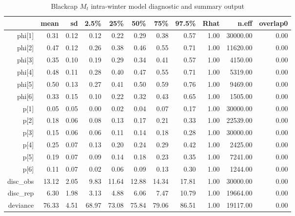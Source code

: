 \begin{table}[ht]
\centering
\begin{tabular}{rrrrrrrrrrr}
  \hline
 & mean & sd & 2.5\% & 25\% & 50\% & 75\% & 97.5\% & Rhat & n.eff & overlap0 \\ 
  \hline
phi[1] & 0.31 & 0.12 & 0.12 & 0.22 & 0.29 & 0.38 & 0.57 & 1.00 & 30000.00 & 0.00 \\ 
  phi[2] & 0.47 & 0.12 & 0.26 & 0.38 & 0.46 & 0.55 & 0.71 & 1.00 & 11620.00 & 0.00 \\ 
  phi[3] & 0.35 & 0.10 & 0.19 & 0.29 & 0.34 & 0.41 & 0.57 & 1.00 & 4150.00 & 0.00 \\ 
  phi[4] & 0.48 & 0.11 & 0.28 & 0.40 & 0.47 & 0.55 & 0.71 & 1.00 & 5319.00 & 0.00 \\ 
  phi[5] & 0.50 & 0.13 & 0.27 & 0.41 & 0.50 & 0.59 & 0.76 & 1.00 & 9469.00 & 0.00 \\ 
  phi[6] & 0.33 & 0.15 & 0.10 & 0.22 & 0.32 & 0.43 & 0.65 & 1.00 & 1505.00 & 0.00 \\ 
  p[1] & 0.05 & 0.05 & 0.00 & 0.02 & 0.04 & 0.07 & 0.17 & 1.00 & 30000.00 & 0.00 \\ 
  p[2] & 0.18 & 0.06 & 0.08 & 0.13 & 0.17 & 0.21 & 0.33 & 1.00 & 22539.00 & 0.00 \\ 
  p[3] & 0.15 & 0.06 & 0.06 & 0.11 & 0.14 & 0.18 & 0.28 & 1.00 & 30000.00 & 0.00 \\ 
  p[4] & 0.25 & 0.07 & 0.13 & 0.20 & 0.24 & 0.29 & 0.42 & 1.00 & 2425.00 & 0.00 \\ 
  p[5] & 0.19 & 0.07 & 0.09 & 0.14 & 0.18 & 0.23 & 0.35 & 1.00 & 7241.00 & 0.00 \\ 
  p[6] & 0.11 & 0.07 & 0.02 & 0.06 & 0.09 & 0.13 & 0.30 & 1.00 & 1244.00 & 0.00 \\ 
  disc\_obs & 13.12 & 2.05 & 9.83 & 11.64 & 12.88 & 14.34 & 17.81 & 1.00 & 30000.00 & 0.00 \\ 
  disc\_rep & 6.30 & 1.98 & 3.13 & 4.88 & 6.06 & 7.47 & 10.79 & 1.00 & 19664.00 & 0.00 \\ 
  deviance & 76.33 & 4.51 & 68.97 & 73.08 & 75.84 & 79.06 & 86.51 & 1.00 & 19117.00 & 0.00 \\ 
   \hline
\end{tabular}
\caption{Blackcap $M_t$ intra-winter model diagnostic and summary output} 
\label{tab:blackcap_m0_intra}
\end{table}
